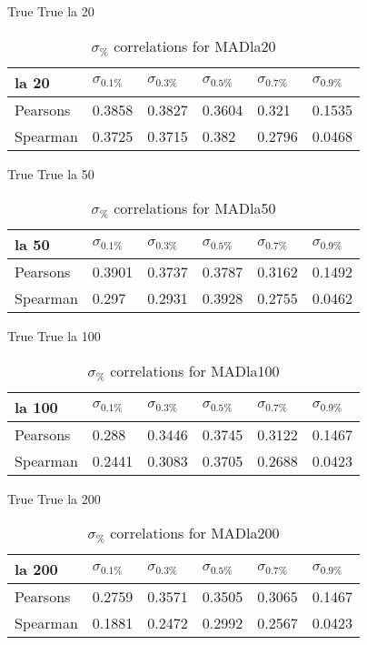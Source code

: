 \documentclass{sig-alternate}
\begin{document}
True True la 20
\begin{table}[h!]
\centering
\caption{$\sigma_{\%}$ correlations for MADla20}
\begin{tabular}{|l|l|l|l|l|l|}
\hline
la 20 & $\sigma_{0.1\%}$ & $\sigma_{0.3\%}$ & $\sigma_{0.5\%}$ & $\sigma_{0.7\%}$ & $\sigma_{0.9\%}$ \\ \hline
Pearsons  & 0.3858 & 0.3827 & 0.3604 & 0.321 & 0.1535 \\ \hline
Spearman  & 0.3725 & 0.3715 & 0.382 & 0.2796 & 0.0468 \\ \hline
\end{tabular}
\end{table}
True True la 50
\begin{table}[h!]
\centering
\caption{$\sigma_{\%}$ correlations for MADla50}
\begin{tabular}{|l|l|l|l|l|l|}
\hline
la 50 & $\sigma_{0.1\%}$ & $\sigma_{0.3\%}$ & $\sigma_{0.5\%}$ & $\sigma_{0.7\%}$ & $\sigma_{0.9\%}$ \\ \hline
Pearsons  & 0.3901 & 0.3737 & 0.3787 & 0.3162 & 0.1492 \\ \hline
Spearman  & 0.297 & 0.2931 & 0.3928 & 0.2755 & 0.0462 \\ \hline
\end{tabular}
\end{table}
True True la 100
\begin{table}[h!]
\centering
\caption{$\sigma_{\%}$ correlations for MADla100}
\begin{tabular}{|l|l|l|l|l|l|}
\hline
la 100 & $\sigma_{0.1\%}$ & $\sigma_{0.3\%}$ & $\sigma_{0.5\%}$ & $\sigma_{0.7\%}$ & $\sigma_{0.9\%}$ \\ \hline
Pearsons  & 0.288 & 0.3446 & 0.3745 & 0.3122 & 0.1467 \\ \hline
Spearman  & 0.2441 & 0.3083 & 0.3705 & 0.2688 & 0.0423 \\ \hline
\end{tabular}
\end{table}
True True la 200
\begin{table}[h!]
\centering
\caption{$\sigma_{\%}$ correlations for MADla200}
\begin{tabular}{|l|l|l|l|l|l|}
\hline
la 200 & $\sigma_{0.1\%}$ & $\sigma_{0.3\%}$ & $\sigma_{0.5\%}$ & $\sigma_{0.7\%}$ & $\sigma_{0.9\%}$ \\ \hline
Pearsons  & 0.2759 & 0.3571 & 0.3505 & 0.3065 & 0.1467 \\ \hline
Spearman  & 0.1881 & 0.2472 & 0.2992 & 0.2567 & 0.0423 \\ \hline
\end{tabular}
\end{table}
\end{document}

